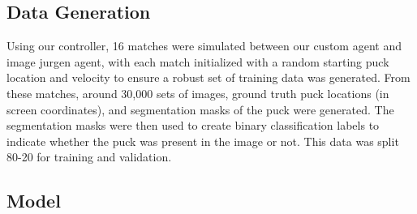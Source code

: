 \documentclass[11pt,a4paper]{article}
\begin{document}
\subsection{Data Generation}

Using our controller, 16 matches were simulated between our custom agent and image jurgen agent, with each match initialized with a random starting puck location and velocity to ensure a robust set of training data was generated. From these matches, around 30,000 sets of images, ground truth puck locations (in screen coordinates), and segmentation masks of the puck were generated. The segmentation masks were then used to create binary classification labels to indicate whether the puck was present in the image or not. This data was split 80-20 for training and validation.


\subsection{Model}
\end{document}
